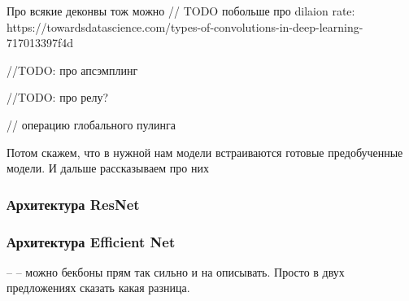 Про всякие деконвы тож можно
// TODO побольше про dilaion rate: https://towardsdatascience.com/types-of-convolutions-in-deep-learning-717013397f4d


//TODO: про апсэмплинг

//TODO: про релу? 

// операцию глобального пулинга

Потом скажем, что в нужной нам модели встраиваются готовые предобученные модели. И дальше рассказываем про них
\subsubsection{Архитектура ResNet}
\subsubsection{Архитектура Efficient Net}  --
    -- можно бекбоны прям так сильно и на описывать. Просто в двух предложениях сказать какая разница.

